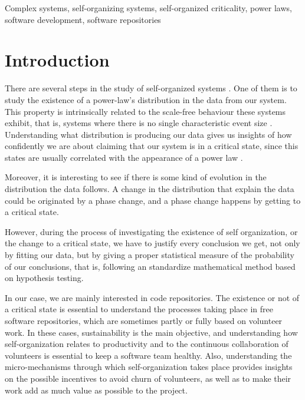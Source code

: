 \documentclass[conference]{IEEEtran}
\begin{document}
\begin{IEEEkeywords}
	Complex systems, self-organizing systems, self-organized criticality, power laws, software development, 
	software repositories
\end{IEEEkeywords}


\section{Introduction}\label{introduction}

There are several steps in the study of self-organized systems  \cite{bak1988self}. One of
them is to study the existence of a power-law's distribution in the data
from our system. This property is intrinsically related to the scale-free behaviour
these systems exhibit, that is, systems where there is no single characteristic event size \cite{golyk20self}.
Understanding what distribution is producing our data gives us insights of
how confidently we are about claiming that our system is in a critical state, since this states
are usually correlated with the appearance of a power law \cite{newman2005power}.

Moreover, it is interesting to see if there is some kind of evolution in the distribution the data follows. 
A change in the distribution that explain the data could be originated by a 
phase change, and a phase change happens by getting to a critical state. %

However, during the process of investigating the existence of self organization, or the change to a critical state, we have to justify every conclusion we get, not only 
by fitting our data, but by giving a proper statistical measure of the probability 
of our conclusions, that is, following an standardize mathematical method based on
hypothesis testing.

In our case, we are mainly interested in code repositories. The
existence or not of a critical state is essential to understand the
processes taking place in free software repositories, which are
sometimes partly or fully based on volunteer work. In these cases,
sustainability is the main objective, and understanding how
self-organization relates to productivity and to the continuous
collaboration of volunteers is essential to keep a software team
healthy. Also, understanding the micro-mechanisms through which
self-organization takes place provides insights on the possible
incentives to avoid churn of volunteers, as well as to make their work
add as much value as possible to the project.
\end{document}
